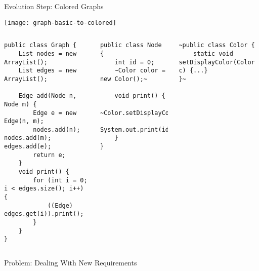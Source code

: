 \begin{frame}[fragile]{Evolution Step: Colored Graphs}
	\vspace{-1.5cm}
	\begin{flushright}
		\texttt{[image: graph-basic-to-colored]}
	\end{flushright}
	\vspace{0.1cm}
	\begin{tiny}
		\begin{columns}
\begin{lstlisting}
public class Graph {
	List nodes = new ArrayList();
	List edges = new ArrayList();

	Edge add(Node n, Node m) {
		Edge e = new Edge(n, m);
		nodes.add(n); nodes.add(m); edges.add(e);
		return e;
	}
	void print() {
		for (int i = 0; i < edges.size(); i++) {
			((Edge) edges.get(i)).print();
		}
	}
}
\end{lstlisting}	
\begin{lstlisting}
public class Node {
	int id = 0;
	~Color color = new Color();~

	void print() {
		~Color.setDisplayColor(color);~
		System.out.print(id);
	}
}
\end{lstlisting}
\begin{lstlisting}
~public class Color {
	static void setDisplayColor(Color c) {...}
}~
\end{lstlisting}
		\end{columns}
	\end{tiny}
\end{frame}

\begin{frame}{Problem: Dealing With New Requirements}
\end{frame}

